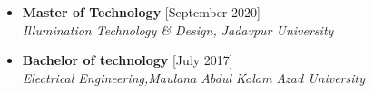 \documentclass[11pt,a4paper]{moderncv}
\begin{document}
\begin{itemize}
	
	\item \textbf{Master of Technology} \hfill [September 2020]\\
	\textit{Illumination Technology \& Design, Jadavpur University}
	
	\item \textbf{Bachelor of technology} \hfill [July 2017]\\
	\textit{Electrical Engineering,Maulana Abdul Kalam Azad University}
	
%	

\end{itemize}

%
%
%
%
%
%
\end{document}
